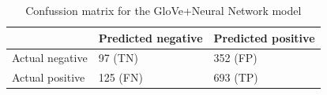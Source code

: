 \begin{table}[htb]
\centering
{
\makegapedcells
\begin{tabular}{lll}
                & Predicted negative & Predicted positive \\
\hline
Actual negative & 97 (TN)           & 352 (FP) \\
Actual positive & 125 (FN)           & 693 (TP) \\
\hline
\end{tabular}
}
\caption{Confussion matrix for the GloVe+Neural Network model}
\label{glovenn_cm}
\end{table}